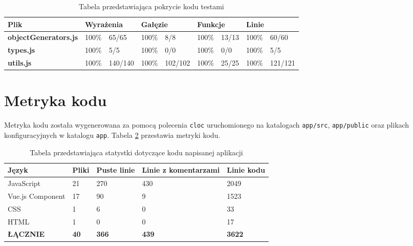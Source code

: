 \documentclass[shortabstract]{iithesis}
\theoremstyle{definition} \newtheorem{definition}{Definicja}[]
\theoremstyle{remark} \newtheorem{remark}[definition]{Observation}
\theoremstyle{plain} \newtheorem{theorem}[definition]{Theorem}
\theoremstyle{plain} \newtheorem{lemma}[definition]{Lemma}
\begin{document}
\begin{table}[h]
    \begin{tabular}{|l|ll|ll|ll|ll|}
    \hline
    \textbf{Plik}                & \multicolumn{2}{l|}{\textbf{Wyrażenia}} & \multicolumn{2}{l|}{\textbf{Gałęzie}} & \multicolumn{2}{l|}{\textbf{Funkcje}} & \multicolumn{2}{l|}{\textbf{Linie}}  \\ \hline
    \textbf{objectGenerators.js} & \multicolumn{1}{l|}{100\%}   & 65/65    & \multicolumn{1}{l|}{100\%}  & 8/8     & \multicolumn{1}{l|}{100\%}   & 13/13  & \multicolumn{1}{l|}{100\%} & 60/60   \\ \hline
    \textbf{types.js}            & \multicolumn{1}{l|}{100\%}   & 5/5      & \multicolumn{1}{l|}{100\%}  & 0/0     & \multicolumn{1}{l|}{100\%}   & 0/0    & \multicolumn{1}{l|}{100\%} & 5/5     \\ \hline
    \textbf{utils.js}            & \multicolumn{1}{l|}{100\%}   & 140/140  & \multicolumn{1}{l|}{100\%}  & 102/102 & \multicolumn{1}{l|}{100\%}   & 25/25  & \multicolumn{1}{l|}{100\%} & 121/121 \\ \hline
    \end{tabular}
    \caption{\label{tab:tests-coverage}Tabela przedstawiająca pokrycie kodu testami}
\end{table}

\section{Metryka kodu}
Metryka kodu została wygenerowana za pomocą polecenia \texttt{cloc} uruchomionego na katalogach \texttt{app/src}, \texttt{app/public} oraz plikach konfiguracyjnych w katalogu \texttt{app}. Tabela \ref{tab:code-lines} przestawia metryki kodu.

\begin{table}[H]
    \begin{tabular}{|l|l|l|l|l|}
    \hline
    \textbf{Język}   & \textbf{Pliki} & \textbf{Puste linie} & \textbf{Linie z komentarzami} & \textbf{Linie kodu} \\ \hline
    JavaScript       & 21             & 270                  & 430                           & 2049                \\ \hline
    Vue.js Component & 17             & 90                   & 9                             & 1523                \\ \hline
    CSS              & 1              & 6                    & 0                             & 33                  \\ \hline
    HTML             & 1              & 0                    & 0                             & 17                  \\ \hline
    \textbf{ŁĄCZNIE} & \textbf{40}    & \textbf{366}         & \textbf{439}                  & \textbf{3622}       \\ \hline
    \end{tabular}
    \caption{\label{tab:code-lines}Tabela przedstawiająca statystki dotyczące kodu napisanej aplikacji}
\end{table}
\end{document}
